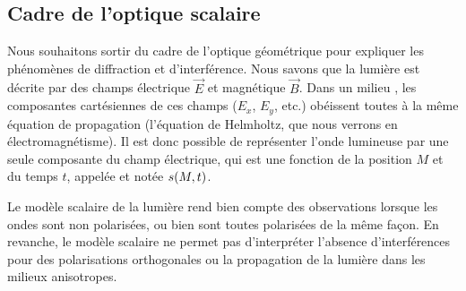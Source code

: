 \documentclass[12pt,fancy]{cours}
\begin{document}

\subsection{Cadre de l’optique scalaire}

Nous souhaitons sortir du cadre de l’optique géométrique pour expliquer les phénomènes de diffraction et d’interférence. Nous savons que la lumière est décrite par des champs électrique $\Vec{E}$ et magnétique $\Vec{B}$.
Dans un milieu , les composantes cartésiennes de ces champs ($E_x$, $E_y$, etc.) obéissent toutes à la même équation de propagation (l'équation de Helmholtz, que nous verrons en électromagnétisme). Il est donc possible de représenter l'onde lumineuse par une seule composante du champ électrique, qui est une fonction  de la position $M$ et du temps $t$, appelée  et notée $s(M,t)$.

\begin{remarque}
  Le modèle scalaire de la lumière rend bien compte des observations
   lorsque les ondes sont non polarisées, ou bien sont toutes polarisées de la même façon.
  En revanche, le modèle scalaire ne permet pas d'interpréter l'absence d'interférences pour des polarisations orthogonales ou la propagation de la lumière dans les milieux anisotropes.

\end{remarque}
\end{document}
